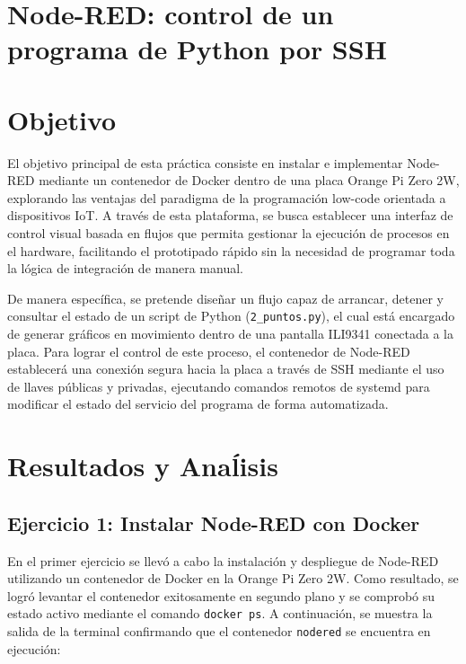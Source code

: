 \documentclass[12pt, letterpaper]{article}
\begin{document}



\normalsize

\section*{\centering \fontsize{14}{17}\sffamily\selectfont Node-RED: control de un programa de Python por SSH}

\section*{\centering \fontsize{14}{17}\sffamily\selectfont Objetivo}

El objetivo principal de esta práctica consiste en instalar e implementar Node-RED mediante un contenedor de Docker dentro de una placa Orange Pi Zero 2W, explorando las ventajas del paradigma de la programación low-code orientada a dispositivos IoT. A través de esta plataforma, se busca establecer una interfaz de control visual basada en flujos que permita gestionar la ejecución de procesos en el hardware, facilitando el prototipado rápido sin la necesidad de programar toda la lógica de integración de manera manual.

De manera específica, se pretende diseñar un flujo capaz de arrancar, detener y consultar el estado de un script de Python (\texttt{2\_puntos.py}), el cual está encargado de generar gráficos en movimiento dentro de una pantalla ILI9341 conectada a la placa. Para lograr el control de este proceso, el contenedor de Node-RED establecerá una conexión segura hacia la placa a través de SSH mediante el uso de llaves públicas y privadas, ejecutando comandos remotos de systemd para modificar el estado del servicio del programa de forma automatizada.

\section*{\centering \fontsize{14}{17}\sffamily\selectfont Resultados y Anaĺisis}

\subsection*{Ejercicio 1: Instalar Node-RED con Docker}

En el primer ejercicio se llevó a cabo la instalación y despliegue de Node-RED utilizando un contenedor de Docker en la Orange Pi Zero 2W. Como resultado, se logró levantar el contenedor exitosamente en segundo plano y se comprobó su estado activo mediante el comando \texttt{docker ps}. A continuación, se muestra la salida de la terminal confirmando que el contenedor \texttt{nodered} se encuentra en ejecución:
\end{document}
